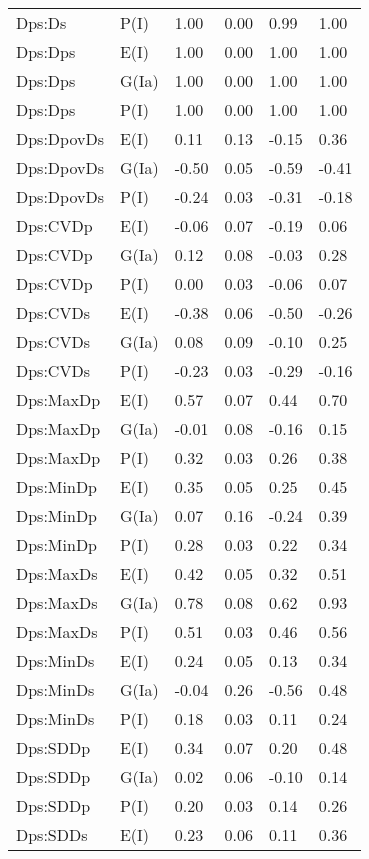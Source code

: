 \begin{center}
\begin{longtable}{|p{1.1in}|p{0.7in}|p{0.7in}|p{0.6in}|p{0.6in}|p{0.6in}|}
  Dps:Ds & P(I) & 1.00 & 0.00 & 0.99 & 1.00 \\ 
  Dps:Dps & E(I) & 1.00 & 0.00 & 1.00 & 1.00 \\ 
  Dps:Dps & G(Ia) & 1.00 & 0.00 & 1.00 & 1.00 \\ 
  Dps:Dps & P(I) & 1.00 & 0.00 & 1.00 & 1.00 \\ 
  Dps:DpovDs & E(I) & 0.11 & 0.13 & -0.15 & 0.36 \\ 
  Dps:DpovDs & G(Ia) & -0.50 & 0.05 & -0.59 & -0.41 \\ 
  Dps:DpovDs & P(I) & -0.24 & 0.03 & -0.31 & -0.18 \\ 
  Dps:CVDp & E(I) & -0.06 & 0.07 & -0.19 & 0.06 \\ 
  Dps:CVDp & G(Ia) & 0.12 & 0.08 & -0.03 & 0.28 \\ 
  Dps:CVDp & P(I) & 0.00 & 0.03 & -0.06 & 0.07 \\ 
  Dps:CVDs & E(I) & -0.38 & 0.06 & -0.50 & -0.26 \\ 
  Dps:CVDs & G(Ia) & 0.08 & 0.09 & -0.10 & 0.25 \\ 
  Dps:CVDs & P(I) & -0.23 & 0.03 & -0.29 & -0.16 \\ 
  Dps:MaxDp & E(I) & 0.57 & 0.07 & 0.44 & 0.70 \\ 
  Dps:MaxDp & G(Ia) & -0.01 & 0.08 & -0.16 & 0.15 \\ 
  Dps:MaxDp & P(I) & 0.32 & 0.03 & 0.26 & 0.38 \\ 
  Dps:MinDp & E(I) & 0.35 & 0.05 & 0.25 & 0.45 \\ 
  Dps:MinDp & G(Ia) & 0.07 & 0.16 & -0.24 & 0.39 \\ 
  Dps:MinDp & P(I) & 0.28 & 0.03 & 0.22 & 0.34 \\ 
  Dps:MaxDs & E(I) & 0.42 & 0.05 & 0.32 & 0.51 \\ 
  Dps:MaxDs & G(Ia) & 0.78 & 0.08 & 0.62 & 0.93 \\ 
  Dps:MaxDs & P(I) & 0.51 & 0.03 & 0.46 & 0.56 \\ 
  Dps:MinDs & E(I) & 0.24 & 0.05 & 0.13 & 0.34 \\ 
  Dps:MinDs & G(Ia) & -0.04 & 0.26 & -0.56 & 0.48 \\ 
  Dps:MinDs & P(I) & 0.18 & 0.03 & 0.11 & 0.24 \\ 
  Dps:SDDp & E(I) & 0.34 & 0.07 & 0.20 & 0.48 \\ 
  Dps:SDDp & G(Ia) & 0.02 & 0.06 & -0.10 & 0.14 \\ 
  Dps:SDDp & P(I) & 0.20 & 0.03 & 0.14 & 0.26 \\ 
  Dps:SDDs & E(I) & 0.23 & 0.06 & 0.11 & 0.36 \\ 

\end{longtable}
\end{center}
